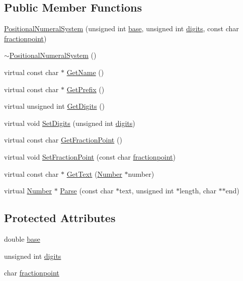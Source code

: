 \subsection*{Public Member Functions}
\begin{DoxyCompactItemize}
\item 
\hyperlink{classPositionalNumeralSystem_a923f36569ecc830f17bcf56dd2811754}{Positional\+Numeral\+System} (unsigned int \hyperlink{classPositionalNumeralSystem_a50cd19222978e16cc9c8b481c72c4662}{base}, unsigned int \hyperlink{classPositionalNumeralSystem_a0a9e8e3f5d46e3c12dd3fc994ed2c1e6}{digits}, const char \hyperlink{classPositionalNumeralSystem_ad986e454b020c21e70f2efbc3682e44f}{fractionpoint})
\item 
\hyperlink{classPositionalNumeralSystem_a4b33a259e571a9668ee0348a5f085f43}{$\sim$\+Positional\+Numeral\+System} ()
\item 
virtual const char $\ast$ \hyperlink{classPositionalNumeralSystem_ab52249b8607a9e67d4676aad39a6e15d}{Get\+Name} ()
\item 
virtual const char $\ast$ \hyperlink{classPositionalNumeralSystem_aad925e0a92b3130c2d7c5567bdeca665}{Get\+Prefix} ()
\item 
virtual unsigned int \hyperlink{classPositionalNumeralSystem_affe52e59623d35844771f6292b140284}{Get\+Digits} ()
\item 
virtual void \hyperlink{classPositionalNumeralSystem_aa65a40609c4bb6530507010065c7e750}{Set\+Digits} (unsigned int \hyperlink{classPositionalNumeralSystem_a0a9e8e3f5d46e3c12dd3fc994ed2c1e6}{digits})
\item 
virtual const char \hyperlink{classPositionalNumeralSystem_aa5bfa3d33bce0955ace2aa4b8c8c9e4b}{Get\+Fraction\+Point} ()
\item 
virtual void \hyperlink{classPositionalNumeralSystem_aac54178aebc6ac802fc930e6b431f612}{Set\+Fraction\+Point} (const char \hyperlink{classPositionalNumeralSystem_ad986e454b020c21e70f2efbc3682e44f}{fractionpoint})
\item 
virtual const char $\ast$ \hyperlink{classPositionalNumeralSystem_ac4acbb807861e8ff702d9624fb5db87d}{Get\+Text} (\hyperlink{structNumber}{Number} $\ast$number)
\item 
virtual \hyperlink{structNumber}{Number} $\ast$ \hyperlink{classPositionalNumeralSystem_a6fd2861b5cd8da952191218121df7f56}{Parse} (const char $\ast$text, unsigned int $\ast$length, char $\ast$$\ast$end)
\end{DoxyCompactItemize}
\subsection*{Protected Attributes}
\begin{DoxyCompactItemize}
\item 
double \hyperlink{classPositionalNumeralSystem_a50cd19222978e16cc9c8b481c72c4662}{base}
\item 
unsigned int \hyperlink{classPositionalNumeralSystem_a0a9e8e3f5d46e3c12dd3fc994ed2c1e6}{digits}
\item 
char \hyperlink{classPositionalNumeralSystem_ad986e454b020c21e70f2efbc3682e44f}{fractionpoint}
\end{DoxyCompactItemize}
